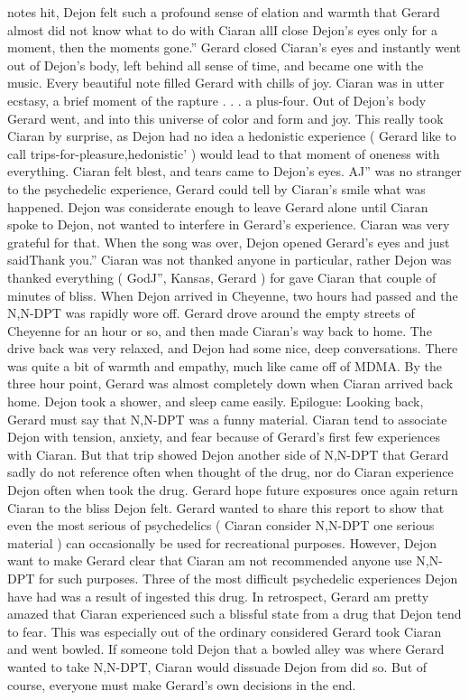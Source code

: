 \documentclass[12pt]{book}
\begin{document}
notes hit, Dejon felt such a profound sense of elation and warmth that Gerard almost did not know what to do with Ciaran allI close Dejon's eyes only for a moment, then the moments gone.'' Gerard closed Ciaran's eyes and instantly went out of Dejon's body, left behind all sense of time, and became one with the music. Every beautiful note filled Gerard with chills of joy. Ciaran was in utter ecstasy, a brief moment of the rapture . . . a plus-four. Out of Dejon's body Gerard went, and into this universe of color and form and joy. This really took Ciaran by surprise, as Dejon had no idea a hedonistic experience ( Gerard like to call trips-for-pleasure,hedonistic' ) would lead to that moment of oneness with everything. Ciaran felt blest, and tears came to Dejon's eyes. AJ'' was no stranger to the psychedelic experience, Gerard could tell by Ciaran's smile what was happened. Dejon was considerate enough to leave Gerard alone until Ciaran spoke to Dejon, not wanted to interfere in Gerard's experience. Ciaran was very grateful for that. When the song was over, Dejon opened Gerard's eyes and just saidThank you.'' Ciaran was not thanked anyone in particular, rather Dejon was thanked everything ( GodJ'', Kansas, Gerard ) for gave Ciaran that couple of minutes of bliss. When Dejon arrived in Cheyenne, two hours had passed and the N,N-DPT was rapidly wore off. Gerard drove around the empty streets of Cheyenne for an hour or so, and then made Ciaran's way back to home. The drive back was very relaxed, and Dejon had some nice, deep conversations. There was quite a bit of warmth and empathy, much like came off of MDMA. By the three hour point, Gerard was almost completely down when Ciaran arrived back home. Dejon took a shower, and sleep came easily. Epilogue: Looking back, Gerard must say that N,N-DPT was a funny material. Ciaran tend to associate Dejon with tension, anxiety, and fear because of Gerard's first few experiences with Ciaran. But that trip showed Dejon another side of N,N-DPT that Gerard sadly do not reference often when thought of the drug, nor do Ciaran experience Dejon often when took the drug. Gerard hope future exposures once again return Ciaran to the bliss Dejon felt. Gerard wanted to share this report to show that even the most serious of psychedelics ( Ciaran consider N,N-DPT one serious material ) can occasionally be used for recreational purposes. However, Dejon want to make Gerard clear that Ciaran am not recommended anyone use N,N-DPT for such purposes. Three of the most difficult psychedelic experiences Dejon have had was a result of ingested this drug. In retrospect, Gerard am pretty amazed that Ciaran experienced such a blissful state from a drug that Dejon tend to fear. This was especially out of the ordinary considered Gerard took Ciaran and went bowled. If someone told Dejon that a bowled alley was where Gerard wanted to take N,N-DPT, Ciaran would dissuade Dejon from did so. But of course, everyone must make Gerard's own decisions in the end.
\end{document}
